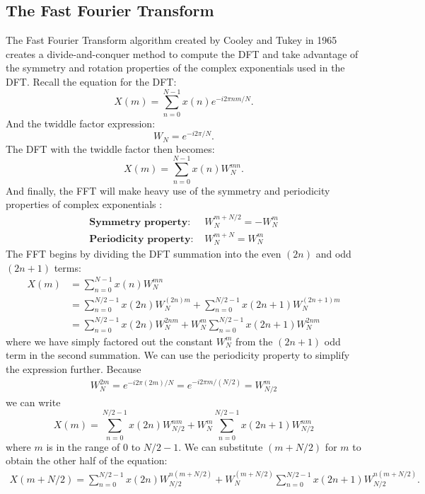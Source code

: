 \documentclass[psamsfonts,reqno]{amsart}
\theoremstyle{definition}
\theoremstyle{remark}
\numberwithin{equation}{section}
\begin{document}
\subsection{The Fast Fourier Transform}
The Fast Fourier Transform algorithm created by Cooley and Tukey in 1965 \cite{cooley1965algorithm} creates a divide-and-conquer method to compute the DFT and take advantage of the symmetry and rotation properties of the complex exponentials used in the DFT. Recall the equation for the DFT:
\begin{equation*}
	X(m) = \sum_{n=0}^{N-1}x(n) e^{-i2\pi nm/N}.
\end{equation*}
And the twiddle factor expression:
\begin{equation*}
	W_N = e^{-i 2 \pi /N}.
\end{equation*}
The DFT with the twiddle factor then becomes:
\begin{equation*}
	X(m) = \sum_{n=0}^{N-1}x(n) W_N^{mn}.
\end{equation*}
And finally, the FFT will make heavy use of the symmetry and periodicity properties of complex exponentials \cite{proakis1995digital}:
\begin{align*}
	\textbf{Symmetry property: }& W_N^{m+N/2} = -W_N^m \\
	\textbf{Periodicity property: }& W_N^{m+N} = W_N^m
\end{align*}
The FFT begins by dividing the DFT summation into the even $(2n)$ and odd $(2n+1)$ terms:
\begin{align*}
	X(m) &= \sum_{n=0}^{N-1}x(n) W_N^{mn} \\
	&= \sum_{n=0}^{N/2-1}x(2n)W_N^{(2n)m} + \sum_{n=0}^{N/2-1}x(2n+1)W_N^{(2n+1)m} \\
	&= \sum_{n=0}^{N/2-1}x(2n)W_N^{2nm} + W_N^m\sum_{n=0}^{N/2-1}x(2n+1)W_N^{2nm}
\end{align*}
where we have simply factored out the constant $W_N^m$ from the $(2n+1)$ odd term in the second summation. We can use the periodicity property to simplify the expression further. Because
\begin{align*}
	W_N^{2m} = e^{-i2\pi(2m)/N} = e^{-i2\pi m/(N/2)} = W_{N/2}^m
\end{align*}
we can write
\begin{equation}
	\label{first_fft_summation}
	X(m) = \sum_{n=0}^{N/2-1} x(2n) W_{N/2}^{nm} + W_N^m \sum_{n=0}^{N/2-1} x(2n+1) W_{N/2}^{nm}
\end{equation}
where $m$ is in the range of $0$ to $N/2-1$. We can substitute $(m+N/2)$ for $m$ to obtain the other half of the equation:
\begin{align}
	\label{complex_second_half_fft}
	X(m+N/2) = \sum_{n=0}^{N/2-1} x(2n) W_{N/2}^{n(m+N/2)} + W_N^{(m+N/2)} \sum_{n=0}^{N/2-1} x(2n+1) W_{N/2}^{n(m+N/2)}.
\end{align}
\end{document}
